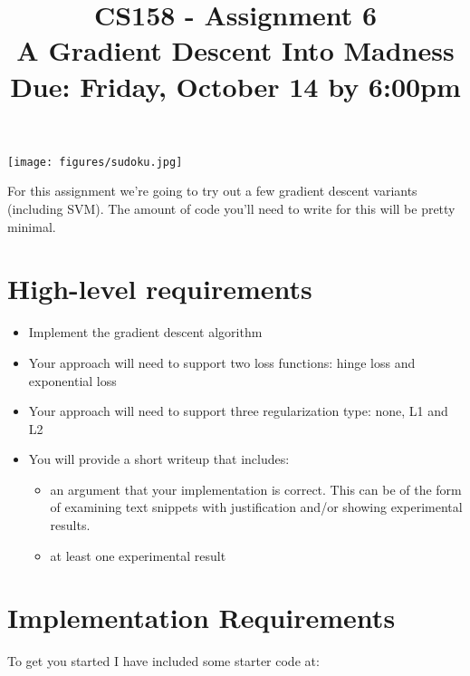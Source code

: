 \documentclass[11pt]{article}
\title{CS158 - Assignment 6\\A Gradient Descent Into Madness\\\small{Due: Friday, October 14 by 6:00pm}}
\author{}
\date{}
\begin{document}
\maketitle

\vspace{-0.8in}

\begin{center}
\texttt{[image: figures/sudoku.jpg]}

\end{center}

For this assignment we're going to try out a few gradient descent variants (including SVM).  The amount of code you'll need to write for this will be pretty minimal. 

\section{High-level requirements}

\begin{itemize}

\item Implement the gradient descent algorithm

\item Your approach will need to support two loss functions: hinge loss and exponential loss

\item Your approach will need to support three regularization type: none, L1 and L2

\item You will provide a short writeup that includes:

\begin{itemize}

\item an argument that your implementation is correct.  This can be of the form of examining text snippets with justification and/or showing experimental results.

\item at least one experimental result

\end{itemize}

\end{itemize}

\section{Implementation Requirements}

To get you started I have included some starter code at:
\end{document}
